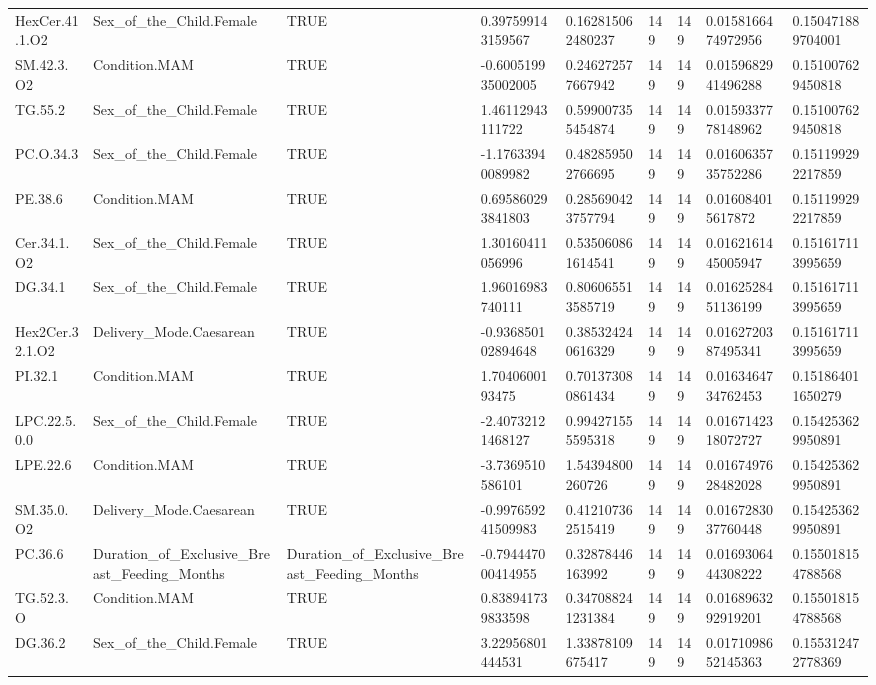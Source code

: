 \begin{longtable}{lllllllll}
HexCer.41.1.O2 & Sex\_of\_the\_Child.Female & TRUE & 0.397599143159567 & 0.162815062480237 & 149 & 149 & 0.0158166474972956 & 0.150471889704001 \\
SM.42.3.O2 & Condition.MAM & TRUE & -0.600519935002005 & 0.246272577667942 & 149 & 149 & 0.0159682941496288 & 0.151007629450818 \\
TG.55.2 & Sex\_of\_the\_Child.Female & TRUE & 1.46112943111722 & 0.599007355454874 & 149 & 149 & 0.0159337778148962 & 0.151007629450818 \\
PC.O.34.3 & Sex\_of\_the\_Child.Female & TRUE & -1.17633940089982 & 0.482859502766695 & 149 & 149 & 0.0160635735752286 & 0.151199292217859 \\
PE.38.6 & Condition.MAM & TRUE & 0.695860293841803 & 0.285690423757794 & 149 & 149 & 0.016084015617872 & 0.151199292217859 \\
Cer.34.1.O2 & Sex\_of\_the\_Child.Female & TRUE & 1.30160411056996 & 0.535060861614541 & 149 & 149 & 0.0162161445005947 & 0.151617113995659 \\
DG.34.1 & Sex\_of\_the\_Child.Female & TRUE & 1.96016983740111 & 0.806065513585719 & 149 & 149 & 0.0162528451136199 & 0.151617113995659 \\
Hex2Cer.32.1.O2 & Delivery\_Mode.Caesarean & TRUE & -0.936850102894648 & 0.385324240616329 & 149 & 149 & 0.0162720387495341 & 0.151617113995659 \\
PI.32.1 & Condition.MAM & TRUE & 1.7040600193475 & 0.701373080861434 & 149 & 149 & 0.0163464734762453 & 0.151864011650279 \\
LPC.22.5.0.0 & Sex\_of\_the\_Child.Female & TRUE & -2.40732121468127 & 0.994271555595318 & 149 & 149 & 0.0167142318072727 & 0.154253629950891 \\
LPE.22.6 & Condition.MAM & TRUE & -3.7369510586101 & 1.54394800260726 & 149 & 149 & 0.0167497628482028 & 0.154253629950891 \\
SM.35.0.O2 & Delivery\_Mode.Caesarean & TRUE & -0.997659241509983 & 0.412107362515419 & 149 & 149 & 0.0167283037760448 & 0.154253629950891 \\
PC.36.6 & Duration\_of\_Exclusive\_Breast\_Feeding\_Months & Duration\_of\_Exclusive\_Breast\_Feeding\_Months & -0.794447000414955 & 0.32878446163992 & 149 & 149 & 0.0169306444308222 & 0.155018154788568 \\
TG.52.3.O & Condition.MAM & TRUE & 0.838941739833598 & 0.347088241231384 & 149 & 149 & 0.0168963292919201 & 0.155018154788568 \\
DG.36.2 & Sex\_of\_the\_Child.Female & TRUE & 3.22956801444531 & 1.33878109675417 & 149 & 149 & 0.0171098652145363 & 0.155312472778369 \\

\end{longtable}
